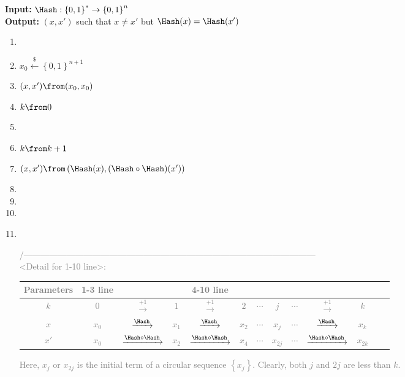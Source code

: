 \documentclass[12pt,openany]{book}
\theoremstyle{definition}
\newcommand{\set}[1]{\left\{#1\right\}}
\newcommand{\dollar}{\$}
\newcommand{\uniform}{\xleftarrow{\dollar}}
\begin{document}
	\begin{tcolorbox}[title=\textbf{Algorithm.}\ Small-Space Attack, coltitle=black, colback=white,colframe=-red, breakable, enhanced]
		\textbf{Input:} $\Hash:\set{0,1}^*\to\set{0,1}^n$\\
		\textbf{Output:} $(x,x')$ such that $x\neq x'$ but $\Hash(x)=\Hash(x')$ \begin{enumerate}[$1$:]
			\item[] \textcolor{gray}{}
			\item $x_0\uniform\set{0,1}^{n+1}$\quad \textcolor{gray}{}
			\item $(x,x')\from (x_0,x_0)$
			\item $k\from0$
			\item {}
			\item \qquad $k\from k+1$
			\item \qquad $(x,x')\from \left(\Hash(x), (\Hash\circ \Hash)(x')\right)$
			\item \qquad{}
			\item \qquad\qquad{}
			\item \qquad{}
			\item {}\\
			\textcolor{gray}{\slash*------------------------------------------------------------------------------------------------------\\
				<Detail for 1-10 line>: \begin{center}
					\begin{tabular}{c|||c||c||c||c||c||c||c||c||c||c||c||c}
						\toprule[1.5pt]
						Parameters & 1-3 line & \multicolumn{7}{c}{4-10 line} \\
						\midrule
						$k$ & $0$ &$\xrightarrow{+1}$ & $1$ &$\xrightarrow{+1}$& $2$ & $\cdots$& $j$& $\cdots$&$\xrightarrow{+1}$& $k$\\
						$x$ & $x_0$ &$\xrightarrow{\Hash}$& $x_1$ &$\xrightarrow{\Hash}$& $x_2$&  $\cdots$& $x_j$& $\cdots$&$\xrightarrow{\Hash}$&$x_k$\\
						$x'$ & $x_0$ &$\xrightarrow{\Hash\circ\Hash}$& $x_2$ &$\xrightarrow{\Hash\circ\Hash}$& $x_4$& $\cdots$& $x_{2j}$& $\cdots$&$\xrightarrow{\Hash\circ\Hash}$& $x_{2k}$\\
						\bottomrule[1.5pt]
					\end{tabular}
				\end{center} Here, $x_j$ or $x_{2j}$ is the initial term of a circular sequence $\set{x_j}$. Clearly, both $j$ and $2j$ are less than $k$.
}
\end{enumerate}
\end{tcolorbox}
\end{document}
